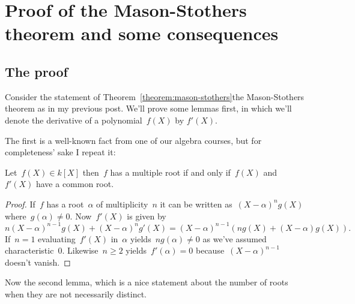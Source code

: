 \section{Proof of the Mason-Stothers theorem and some consequences}
\label{section:proof-and-consequences}

\subsection{The proof}

Consider the statement of \iftex Theorem~\ref{theorem:mason-stothers}\fi\ifblog the Mason-Stothers theorem as in my previous post\fi. We'll prove some lemmas first, in which we'll denote the derivative of a polynomial~$f(X)$ by $f'(X)$.

The first is a well-known fact from one of our algebra courses, but for completeness' sake I repeat it:

\begin{lemma}
  Let~$f(X)\in k[X]$ then~$f$ has a multiple root if and only if~$f(X)$ and~$f'(X)$ have a common root.

  \begin{proof}
    If~$f$ has a root~$\alpha$ of multiplicity~$n$ it can be written as~$(X-\alpha)^ng(X)$ where~$g(\alpha)\neq 0$. Now~$f'(X)$ is given by
    \begin{equation}
      n(X-\alpha)^{n-1}g(X)+(X-\alpha)^ng'(X)=(X-\alpha)^{n-1}\left( ng(X)+(X-\alpha)g(X) \right).
    \end{equation}
    If~$n=1$ evaluating~$f'(X)$ in~$\alpha$ yields~$ng(\alpha)\neq 0$ as we've assumed characteristic~$0$. Likewise~$n\geq 2$ yields~$f'(\alpha)=0$ because~$(X-\alpha)^{n-1}$ doesn't vanish.
  \end{proof}
\end{lemma}

Now the second lemma, which is a nice statement about the number of roots when they are not necessarily distinct.

